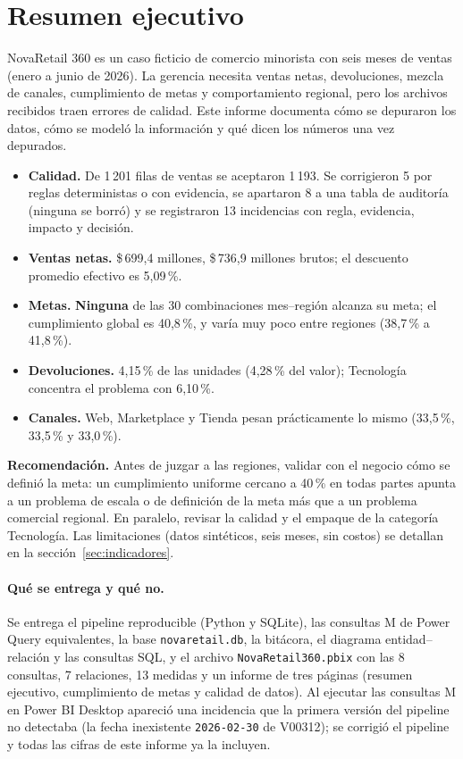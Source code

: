 \documentclass[11pt,letterpaper]{article}
\newcommand{\cop}[1]{\$\,#1}
\newcommand{\destacar}[1]{{\color{udrojoosc}\bfseries #1}}
\begin{document}
\UDportada
\tableofcontents
\newpage

\section{Resumen ejecutivo}

NovaRetail 360 es un caso ficticio de comercio minorista con seis meses de ventas (enero a junio de 2026).
La gerencia necesita ventas netas, devoluciones, mezcla de canales, cumplimiento de metas y comportamiento
regional, pero los archivos recibidos traen errores de calidad. Este informe documenta cómo se depuraron los
datos, cómo se modeló la información y qué dicen los números una vez depurados.

\begin{itemize}
  \item \textbf{Calidad.} De 1\,201 filas de ventas se aceptaron 1\,193. Se corrigieron 5 por reglas
        deterministas o con evidencia, se apartaron 8 a una tabla de auditoría (ninguna se borró) y se
        registraron 13 incidencias con regla, evidencia, impacto y decisión.
  \item \textbf{Ventas netas.} \cop{699,4} millones, \cop{736,9} millones brutos; el descuento promedio
        efectivo es 5,09\,\%.
  \item \textbf{Metas.} \destacar{Ninguna} de las 30 combinaciones mes--región alcanza su meta; el cumplimiento
        global es 40,8\,\%, y varía muy poco entre regiones (38,7\,\% a 41,8\,\%).
  \item \textbf{Devoluciones.} 4,15\,\% de las unidades (4,28\,\% del valor); Tecnología concentra el
        problema con 6,10\,\%.
  \item \textbf{Canales.} Web, Marketplace y Tienda pesan prácticamente lo mismo (33,5\,\%, 33,5\,\% y 33,0\,\%).
\end{itemize}

\textbf{Recomendación.} Antes de juzgar a las regiones, validar con el negocio cómo se definió la meta: un
cumplimiento uniforme cercano a 40\,\% en todas partes apunta a un problema de escala o de definición de la
meta más que a un problema comercial regional. En paralelo, revisar la calidad y el empaque de la categoría
Tecnología. Las limitaciones (datos sintéticos, seis meses, sin costos) se detallan en la
sección~\ref{sec:indicadores}.

\paragraph{Qué se entrega y qué no.} Se entrega el pipeline reproducible (Python y SQLite), las consultas M de
Power Query equivalentes, la base \texttt{novaretail.db}, la bitácora, el diagrama entidad--relación y las
consultas SQL, y el archivo \texttt{NovaRetail360.pbix} con las 8 consultas, 7 relaciones, 13 medidas y un informe
de tres páginas (resumen ejecutivo, cumplimiento de metas y calidad de datos). Al ejecutar las consultas M en
Power BI Desktop apareció una incidencia que la primera versión del pipeline no detectaba (la fecha inexistente
\texttt{2026-02-30} de V00312); se corrigió el pipeline y todas las cifras de este informe ya la incluyen.
\end{document}

